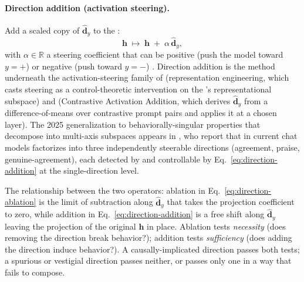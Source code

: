\paragraph{Direction addition (activation steering).} Add a scaled
copy of $\hat{\mathbf{d}}_y$ to the :
\begin{equation}
  \boxed{\;
  \mathbf{h} \;\mapsto\;
  \mathbf{h} \;+\; \alpha\,\hat{\mathbf{d}}_y,
  \;}
  \label{eq:direction-addition}
\end{equation}
with $\alpha \in \mathbb{R}$ a steering coefficient that can be
positive (push the model toward $y = +$) or negative (push toward
$y = -$) \citep{marks-tegmark-2023-truth}. Direction addition is the
method underneath the activation-steering family of
(representation engineering, which casts steering as a control-theoretic
intervention on the 's representational subspace) and
 (Contrastive
Activation Addition, which derives $\hat{\mathbf{d}}_y$ from a
difference-of-means over contrastive prompt pairs and applies it at a
chosen layer). The 2025 generalization to behaviorally-singular
properties that decompose into multi-axis subspaces appears in
, who report that  in current chat models
factorizes into three independently steerable directions (agreement,
praise, genuine-agreement), each detected by  and
controllable by Eq.~\eqref{eq:direction-addition} at the
single-direction level.

The relationship between the two operators: ablation in
Eq.~\eqref{eq:direction-ablation} is the limit of subtraction along
$\hat{\mathbf{d}}_y$ that takes the projection coefficient to zero,
while addition in Eq.~\eqref{eq:direction-addition} is a free shift
along $\hat{\mathbf{d}}_y$ leaving the projection of the original
$\mathbf{h}$ in place. Ablation tests \emph{necessity} (does removing
the direction break behavior?); addition tests \emph{sufficiency}
(does adding the direction induce behavior?). A causally-implicated
direction passes both tests; a spurious or vestigial direction passes
neither, or passes only one in a way that fails to compose.

